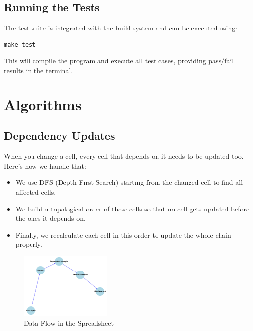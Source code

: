 \documentclass{article}
\begin{document}
\subsection{Running the Tests}
The test suite is integrated with the build system and can be executed using:
\begin{lstlisting}
make test
\end{lstlisting}
This will compile the program and execute all test cases, providing pass/fail results in the terminal.


\section{Algorithms}

\subsection{Dependency Updates}
When you change a cell, every cell that depends on it needs to be updated too. Here's how we handle that:
\begin{itemize}
    \item We use DFS (Depth-First Search) starting from the changed cell to find all affected cells.
    \item We build a topological order of these cells so that no cell gets updated before the ones it depends on.
    \item Finally, we recalculate each cell in this order to update the whole chain properly.
\end{itemize}
\begin{figure}[h]
    \centering
    \includegraphics[width=0.4\textwidth]{data_flow.png}
    \caption{Data Flow in the Spreadsheet}
\end{figure}
\end{document}
